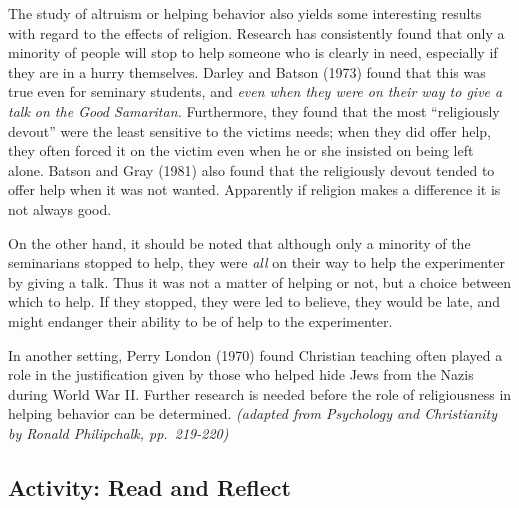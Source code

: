 \documentclass[
]{book}
\begin{document}
The study of altruism or helping behavior also yields some interesting results with regard to the effects of religion. Research has consistently found that only a minority of people will stop to help someone who is clearly in need, especially if they are in a hurry themselves. Darley and Batson (1973) found that this was true even for seminary students, and \emph{even when they were on their way to give a talk on the Good Samaritan.} Furthermore, they found that the most ``religiously devout'' were the least sensitive to the victims needs; when they did offer help, they often forced it on the victim even when he or she insisted on being left alone. Batson and Gray (1981) also found that the religiously devout tended to offer help when it was not wanted. Apparently if religion makes a difference it is not always good.

On the other hand, it should be noted that although only a minority of the seminarians stopped to help, they were \emph{all} on their way to help the experimenter by giving a talk. Thus it was not a matter of helping or not, but a choice between which to help. If they stopped, they were led to believe, they would be late, and might endanger their ability to be of help to the experimenter.

In another setting, Perry London (1970) found Christian teaching often played a role in the justification given by those who helped hide Jews from the Nazis during World War II. Further research is needed before the role of religiousness in helping behavior can be determined. \emph{(adapted from Psychology and Christianity by Ronald Philipchalk, pp.~219-220)}

\hypertarget{activity-read-and-reflect-11}{%
\subsection*{Activity: Read and Reflect}\label{activity-read-and-reflect-11}}
\end{document}
